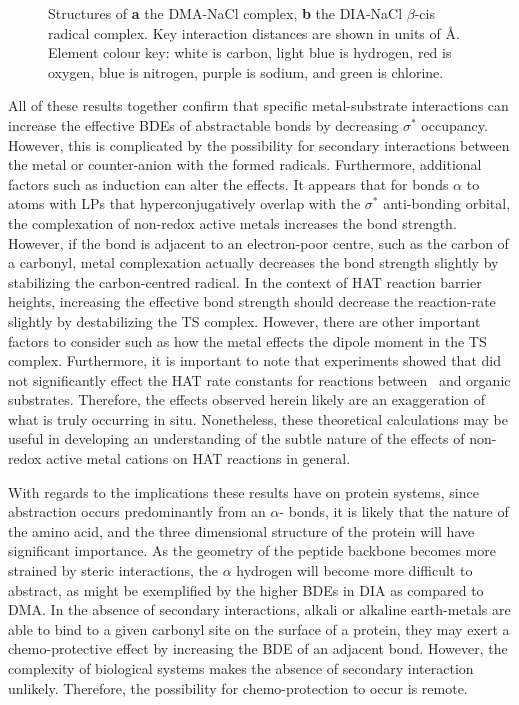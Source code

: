 \begin{doublespace}
\begin{figure}[!htbp]
  \caption[Structures of the DIA-NaCl complex and radical complex.]{Structures
  of \textbf{a} the DMA-NaCl complex, \textbf{b} the DIA-NaCl $\beta$-cis
  radical complex. Key interaction distances are shown in units of \AA. Element
  colour key: white is carbon, light blue is hydrogen, red is oxygen, blue is
  nitrogen, purple is sodium, and green is chlorine.} \label{fig:dia-na-cl}
\end{figure}

All of these results together confirm that specific metal-substrate interactions
can increase the effective BDEs of abstractable  bonds by decreasing
 $\sigma^*$ occupancy. However, this is complicated by the possibility
for secondary interactions between the metal or counter-anion with the formed
radicals. Furthermore, additional factors such as induction can alter the
effects. It appears that for  bonds $\alpha$ to atoms with LPs that
hyperconjugatively overlap with the  $\sigma^*$ anti-bonding orbital,
the complexation of non-redox active metals increases the  bond
strength. However, if the  bond is adjacent to an electron-poor centre,
such as the carbon of a carbonyl, metal complexation actually decreases the bond
strength slightly by stabilizing the carbon-centred radical. In the context of
HAT reaction barrier heights, increasing the effective  bond strength
should decrease the reaction-rate slightly by destabilizing the TS complex.
However, there are other important factors to consider such as how the metal
effects the dipole moment in the TS complex. Furthermore, it is important to
note that experiments showed that  did not significantly effect the
HAT rate constants for reactions between \cumo\ and organic substrates.
Therefore, the effects observed herein likely are an exaggeration of what is
truly occurring in situ. Nonetheless, these theoretical calculations may be
useful in developing an understanding of the subtle nature of the effects of
non-redox active metal cations on HAT reactions in general.

With regards to the implications these results have on protein systems, since
abstraction occurs predominantly from an $\alpha$- bonds, it is likely
that the nature of the amino acid, and the three dimensional structure of the
protein will have significant importance. As the geometry of the peptide
backbone becomes more strained by steric interactions, the $\alpha$ hydrogen
will become more difficult to abstract, as might be exemplified by the higher
 BDEs in DIA as compared to DMA. In the absence of secondary
interactions, alkali or alkaline earth-metals are able to bind to a given
carbonyl site on the surface of a protein, they may exert a chemo-protective
effect by increasing the BDE of an adjacent  bond. However, the
complexity of biological systems makes the absence of secondary interaction
unlikely. Therefore, the possibility for chemo-protection to occur is remote.


\end{doublespace}
